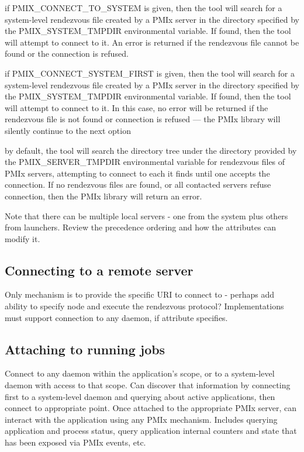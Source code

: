 if PMIX_CONNECT_TO_SYSTEM is given, then the tool will search for a system-level rendezvous file created by a PMIx server in the directory specified by the PMIX_SYSTEM_TMPDIR environmental variable. If found, then the tool will attempt to connect to it. An error is returned if the rendezvous file cannot be found or the connection is refused.

if PMIX_CONNECT_SYSTEM_FIRST is given, then the tool will search for a system-level rendezvous file created by a PMIx server in the directory specified by the PMIX_SYSTEM_TMPDIR environmental variable. If found, then the tool will attempt to connect to it. In this case, no error will be returned if the rendezvous file is not found or connection is refused — the PMIx library will silently continue to the next option

by default, the tool will search the directory tree under the directory provided by the PMIX_SERVER_TMPDIR environmental variable for rendezvous files of PMIx servers, attempting to connect to each it finds until one accepts the connection. If no rendezvous files are found, or all contacted servers refuse connection, then the PMIx library will return an error.

Note that there can be multiple local servers - one from the system plus others from launchers. Review the precedence ordering and how the attributes can modify it.


\subsection{Connecting to a remote server}

Only mechanism is to provide the specific URI to connect to - perhaps add ability to specify node and execute the rendezvous protocol? Implementations must support connection to any daemon, if attribute specifies.


\subsection{Attaching to running jobs}

Connect to any daemon within the application's scope, or to a system-level daemon with access to that scope. Can discover that information by connecting first to a system-level daemon and querying about active applications, then connect to appropriate point. Once attached to the appropriate PMIx server, can interact with the application using any PMIx mechanism. Includes querying application and process status, query application internal counters and state that has been exposed via PMIx events, etc.

